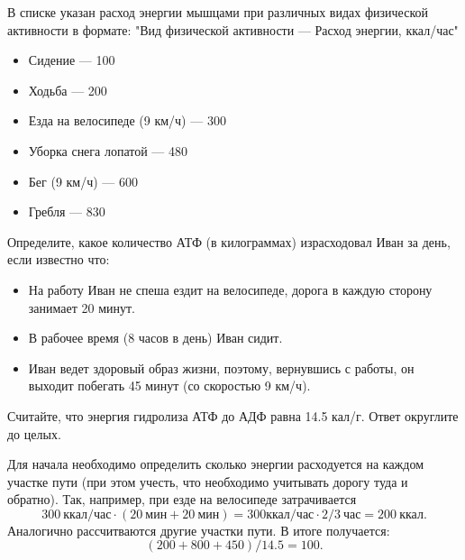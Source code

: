 
В списке указан расход энергии мышцами при различных
видах физической активности в формате: "Вид физической активности — Расход энергии, ккал/час"

\begin{itemize}
    \item Сидение — 100
    \item Ходьба — 200
    \item Езда на велосипеде (9 км/ч) — 300
    \item Уборка снега лопатой — 480
    \item Бег (9 км/ч) — 600
    \item Гребля — 830
\end{itemize}
 
Определите, какое количество АТФ
(в килограммах) израсходовал Иван за день, если известно что:

\begin{itemize}
    \item На работу Иван не спеша ездит на велосипеде, дорога в каждую сторону занимает 20 минут.
    \item В рабочее время (8 часов в день) Иван сидит.
    \item Иван ведет здоровый образ жизни, поэтому, вернувшись с работы, он выходит побегать 45 минут (со скоростью 9 км/ч).
\end{itemize}

Считайте, что энергия гидролиза
АТФ до АДФ равна 14.5 кал/г. Ответ округлите до целых.

\solutionSection

Для начала необходимо определить сколько энергии расходуется на каждом 
участке пути (при этом учесть, что необходимо учитывать дорогу туда и 
обратно). Так, например, при езде на велосипеде затрачивается $$300 \: \text{ккал/час} \cdot (20 \: \text{мин} + 20 \: \text{мин}) = 300 \text{ккал/час} \cdot 2/3 \: \text{час} = 200 \: \text{ккал}.$$ 
Аналогично рассчитваются другие участки пути. В итоге получается:
$$(200 + 800 + 450) / 14.5 = 100.$$

